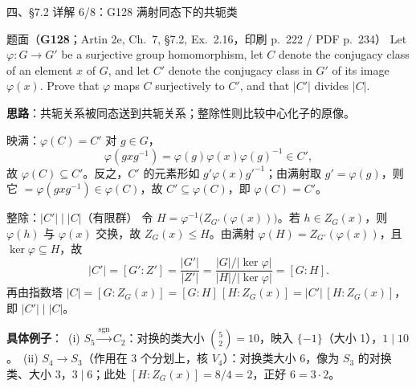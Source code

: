 \documentclass[aspectratio=169,10pt,fontset=none]{ctexbeamer}
\newcommand{\ex}[1]{\textcolor{accent}{\footnotesize\bfseries #1}}
\newcommand{\key}[1]{\textcolor{ink}{\bfseries #1}}
\begin{document}
\begin{frame}[t]{四、\S7.2 详解 6/8：G128 满射同态下的共轭类}
\label{ex:G128}
\scriptsize
\begin{block}{\footnotesize 题面（\ex{G128}；Artin 2e, Ch.~7, \S7.2, Ex.~2.16，印刷 p.~222 / PDF p.~234）}
Let $\varphi:G\to G'$ be a surjective group homomorphism, let $C$ denote the conjugacy class of an element $x$ of $G$, and let $C'$ denote the conjugacy class in $G'$ of its image $\varphi(x)$. Prove that $\varphi$ maps $C$ surjectively to $C'$, and that $|C'|$ divides $|C|$.
\end{block}
\key{思路}：共轭关系被同态送到共轭关系；整除性则比较中心化子的原像。
\begin{block}{\footnotesize 映满：$\varphi(C)=C'$}
对 $g\in G$，
\[
\varphi(gxg^{-1})=\varphi(g)\varphi(x)\varphi(g)^{-1}\in C',
\]
故 $\varphi(C)\subseteq C'$。反之，$C'$ 的元素形如 $g'\varphi(x)g'^{-1}$；由满射取 $g'=\varphi(g)$，则它 $=\varphi(gxg^{-1})\in\varphi(C)$，故 $C'\subseteq\varphi(C)$，即 $\varphi(C)=C'$。
\end{block}
\begin{block}{\footnotesize 整除：$|C'|\mid|C|$（有限群）}
令 $H=\varphi^{-1}\bigl(Z_{G'}(\varphi(x))\bigr)$。若 $h\in Z_G(x)$，则 $\varphi(h)$ 与 $\varphi(x)$ 交换，故 $Z_G(x)\le H$。由满射 $\varphi(H)=Z_{G'}(\varphi(x))$，且 $\ker\varphi\subseteq H$，故
\[
|C'|=[G':Z']=\frac{|G'|}{|Z'|}=\frac{|G|/|\ker\varphi|}{|H|/|\ker\varphi|}=[G:H].
\]
再由指数塔 $|C|=[G:Z_G(x)]=[G:H]\,[H:Z_G(x)]=|C'|\,[H:Z_G(x)]$，即 $|C'|\mid|C|$。
\end{block}
\key{具体例子}：\ (i) $S_5\xrightarrow{\operatorname{sgn}}C_2$：对换的类大小 $\binom52=10$，映入 $\{-1\}$（大小 1），$1\mid10$。\ (ii) $S_4\to S_3$（作用在 3 个分划上，核 $V_4$）：对换类大小 6，像为 $S_3$ 的对换类、大小 3，$3\mid6$；此处 $[H:Z_G(x)]=8/4=2$，正好 $6=3\cdot2$。
\end{frame}
\end{document}
